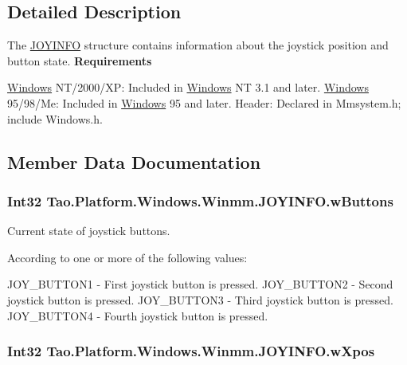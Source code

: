 \subsection{Detailed Description}
The \hyperlink{struct_tao_1_1_platform_1_1_windows_1_1_winmm_1_1_j_o_y_i_n_f_o}{JOYINFO} structure contains information about the joystick position and button state. {\bfseries Requirements} 

\hyperlink{namespace_tao_1_1_platform_1_1_windows}{Windows} NT/2000/XP: Included in \hyperlink{namespace_tao_1_1_platform_1_1_windows}{Windows} NT 3.1 and later. \hyperlink{namespace_tao_1_1_platform_1_1_windows}{Windows} 95/98/Me: Included in \hyperlink{namespace_tao_1_1_platform_1_1_windows}{Windows} 95 and later. Header: Declared in Mmsystem.h; include Windows.h. 

\subsection{Member Data Documentation}
\hypertarget{struct_tao_1_1_platform_1_1_windows_1_1_winmm_1_1_j_o_y_i_n_f_o_a4379fd286bf997c696c8d0d38d689996}{
\subsubsection[{wButtons}]{\setlength{\rightskip}{0pt plus 5cm}Int32 {\bf Tao.Platform.Windows.Winmm.JOYINFO.wButtons}}}
\label{struct_tao_1_1_platform_1_1_windows_1_1_winmm_1_1_j_o_y_i_n_f_o_a4379fd286bf997c696c8d0d38d689996}


Current state of joystick buttons. 

According to one or more of the following values:

JOY\_\-BUTTON1 -\/ First joystick button is pressed. JOY\_\-BUTTON2 -\/ Second joystick button is pressed. JOY\_\-BUTTON3 -\/ Third joystick button is pressed. JOY\_\-BUTTON4 -\/ Fourth joystick button is pressed. \hypertarget{struct_tao_1_1_platform_1_1_windows_1_1_winmm_1_1_j_o_y_i_n_f_o_a0c3a02bf0d0620943d610f903346c4b5}{
\subsubsection[{wXpos}]{\setlength{\rightskip}{0pt plus 5cm}Int32 {\bf Tao.Platform.Windows.Winmm.JOYINFO.wXpos}}}
\label{struct_tao_1_1_platform_1_1_windows_1_1_winmm_1_1_j_o_y_i_n_f_o_a0c3a02bf0d0620943d610f903346c4b5}


